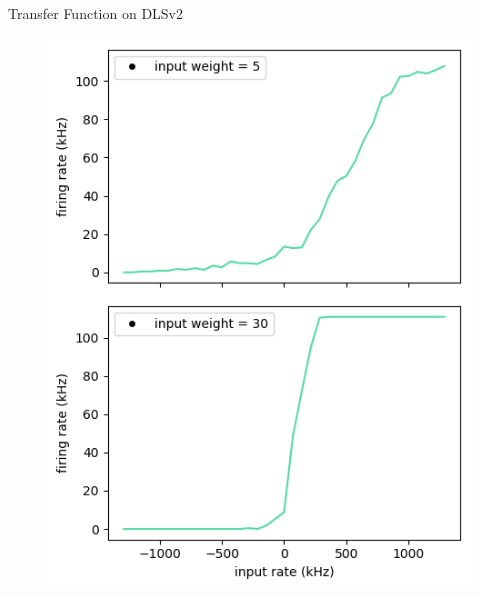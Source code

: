 \documentclass[12pt, aspectratio=169]{beamer}
\begin{document}
\begin{frame}{Transfer Function on DLSv2}
    \centering
            \begin{figure}
                \includegraphics[scale=0.48]{mfp/uncalibrated_activation_function_input_single.png}
                \label{membrane_potential}
            \end{figure}
\end{frame}
\end{document}
